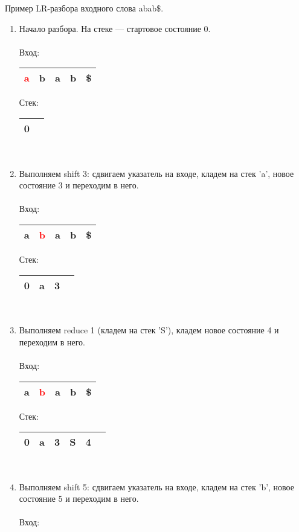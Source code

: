 \begin{example}
Пример LR-разбора входного слова abab\$.
\begin{enumerate}
\item Начало разбора. На стеке --- стартовое состояние 0. \\ \\
Вход: \,
\begin{tabular}[c]{ |c|c|c|c|c| } 
    \hline \textcolor{red}{a} & b & a & b & \$ \\ \hline
\end{tabular}
\qquad Стек: \,
\begin{tabular}[c]{ |c|c } 
    \hline 0 & \\ \hline
\end{tabular}  
\\
\item Выполняем shift 3: сдвигаем указатель на входе, кладем на стек 'a', новое состояние 3 и переходим в него. \\ \\
Вход: \,
\begin{tabular}[c]{ |c|c|c|c|c| } 
    \hline a & \textcolor{red}{b} & a & b & \$ \\ \hline
\end{tabular}
\qquad Стек: \,
\begin{tabular}[c]{ |c|c|c|c } 
    \hline 0 & a & 3 & \\ \hline
\end{tabular}
\\ 
\item Выполняем reduce 1 (кладем на стек 'S'), кладем новое состояние 4 и переходим в него. \\ \\
Вход: \,
\begin{tabular}[c]{ |c|c|c|c|c| } 
    \hline a & \textcolor{red}{b} & a & b & \$ \\ \hline
\end{tabular}
\qquad Стек: \,
\begin{tabular}[c]{ |c|c|c|c|c|c } 
    \hline 0 & a & 3 & S & 4 & \\ \hline
\end{tabular}
\\ 
\item Выполняем shift 5: сдвигаем указатель на входе, кладем на стек 'b', новое состояние 5 и переходим в него. \\ \\
Вход: \,
\begin{tabular}[c]{ |c|c|c|c|c| } 

\end{tabular}
\end{enumerate}
\end{example}
